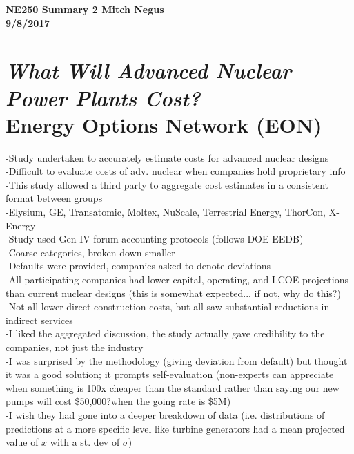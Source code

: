 \documentclass{report}
\begin{document}
\thispagestyle{empty}

{\bf {\large {NE250 Summary {2} \hfill Mitch Negus\\
		\hspace*{\fill} 9/8/2017\\ }}}
\section*{\textsl{What Will Advanced Nuclear Power Plants Cost?} \\ \normalsize Energy Options Network (EON)}

-Study undertaken to accurately estimate costs for advanced nuclear designs\\
-Difficult to evaluate costs of adv. nuclear when companies hold proprietary info\\
-This study allowed a third party to aggregate cost estimates in a consistent format between groups\\
-Elysium, GE, Transatomic, Moltex, NuScale, Terrestrial Energy, ThorCon, X-Energy\\
-Study used Gen IV forum accounting protocols (follows DOE EEDB)\\
-Coarse categories, broken down smaller\\
-Defaults were provided, companies asked to denote deviations\\
-All participating companies had lower capital, operating, and LCOE projections than current nuclear designs (this is somewhat expected... if not, why do this?)\\
-Not all lower direct construction costs, but all saw substantial reductions in indirect services\\

-I liked the aggregated discussion, the study actually gave credibility to the companies, not just the industry\\
-I was surprised by the methodology (giving deviation from default) but thought it was a good solution; it prompts self-evaluation (non-experts can appreciate when something is 100x cheaper than the standard rather than saying our new pumps will cost \$50,000?when the going rate is \$5M)\\
-I wish they had gone into a deeper breakdown of data (i.e. distributions of predictions at a more specific level like turbine generators had a mean projected value of $x$ with a st. dev of $\sigma$)\\
\end{document}
